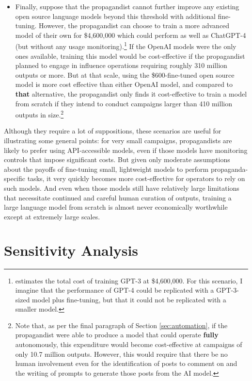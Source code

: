 \documentclass{article}
\begin{document}
\begin{itemize}
  \item Finally, suppose that the propagandist cannot further improve any existing open source language models beyond this threshold with additional fine-tuning. However, the propagandist can choose to train a more advanced model of their own for \$4,600,000 which could perform as well as ChatGPT-4 (but without any usage monitoring).\footnote{\cite{gpt3cost} estimates the total cost of training GPT-3 at \$4,600,000. For this scenario, I imagine that the performance of GPT-4 could be replicated with a GPT-3-sized model plus fine-tuning, but that it could not be replicated with a smaller model.} If the OpenAI models were the only ones available, training this model would be cost-effective if the propagandist planned to engage in influence operations requiring roughly 310 million outputs or more. But at that scale, using the \$600-fine-tuned open source model is more cost effective than either OpenAI model, and compared to \textbf{that} alternative, the propagandist only finds it cost-effective to train a model from scratch if they intend to conduct campaigns larger than 410 million outputs in size.\footnote{Note that, as per the final paragraph of Section \ref{sec:automation}, if the propagandist were able to produce a model that could operate \textbf{fully} autonomously, this expenditure would become cost-effective at campaigns of only 10.7 million outputs. However, this would require that there be no human involvement even for the identification of posts to comment on and the writing of prompts to generate those posts from the AI model.}
\end{itemize}

Although they require a lot of suppositions, these scenarios are useful for illustrating some general points: for very small campaigns, propagandists are likely to prefer using API-accessible models, even if those models have monitoring controls that impose significant costs. But given only moderate assumptions about the payoffs of fine-tuning small, lightweight models to perform propaganda-specific tasks, it very quickly becomes more cost-effective for operators to rely on such models. And even when those models still have relatively large limitations that necessitate continued and careful human curation of outputs, training a large language model from scratch is almost never economically worthwhile except at extremely large scales. 

\section{Sensitivity Analysis}
\label{sec:robustness}
\end{document}
